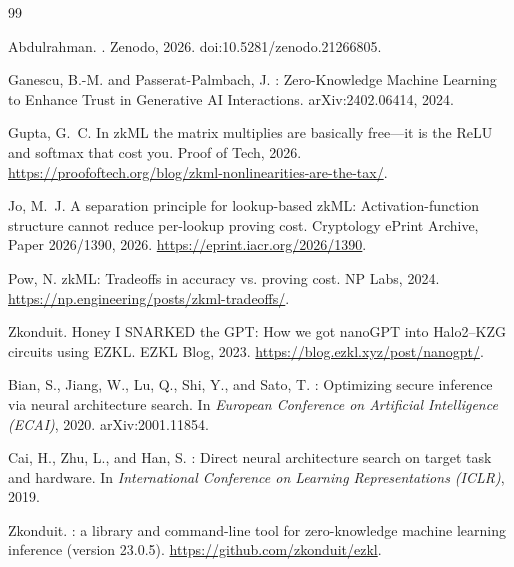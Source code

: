 \documentclass[10pt]{article}
\begin{document}
\begin{thebibliography}{99}

Abdulrahman.
.
\newblock Zenodo, 2026. doi:10.5281/zenodo.21266805.

Ganescu, B.-M. and Passerat-Palmbach, J.
: Zero-Knowledge Machine Learning to Enhance
  Trust in Generative {AI} Interactions.
\newblock arXiv:2402.06414, 2024.

Gupta, G.~C.
\newblock In zk{ML} the matrix multiplies are basically free---it is the {ReLU}
  and softmax that cost you.
\newblock Proof of Tech, 2026.
\newblock \url{https://proofoftech.org/blog/zkml-nonlinearities-are-the-tax/}.

Jo, M.~J.
\newblock A separation principle for lookup-based zk{ML}: Activation-function
  structure cannot reduce per-lookup proving cost.
\newblock Cryptology {ePrint} Archive, Paper 2026/1390, 2026.
\newblock \url{https://eprint.iacr.org/2026/1390}.

Pow, N.
\newblock zk{ML}: Tradeoffs in accuracy vs. proving cost.
\newblock NP Labs, 2024.
\newblock \url{https://np.engineering/posts/zkml-tradeoffs/}.

Zkonduit.
\newblock Honey I {SNARKED} the {GPT}: How we got nano{GPT} into {Halo2}--{KZG}
  circuits using {EZKL}.
\newblock EZKL Blog, 2023.
\newblock \url{https://blog.ezkl.xyz/post/nanogpt/}.

Bian, S., Jiang, W., Lu, Q., Shi, Y., and Sato, T.
: Optimizing secure inference via neural architecture search.
\newblock In \emph{European Conference on Artificial Intelligence (ECAI)}, 2020.
  arXiv:2001.11854.

Cai, H., Zhu, L., and Han, S.
: Direct neural architecture search on target task and
  hardware.
\newblock In \emph{International Conference on Learning Representations
  (ICLR)}, 2019.

Zkonduit.
: a library and command-line tool for zero-knowledge machine
  learning inference (version 23.0.5).
\newblock \url{https://github.com/zkonduit/ezkl}.


\end{thebibliography}
\end{document}
